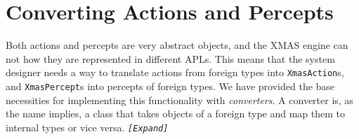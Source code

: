
\section{Converting Actions and Percepts}

Both actions and percepts are very abstract objects, and the XMAS
engine can not how they are represented in different APLs. This means
that the system designer needs a way to translate actions from foreign
types into \texttt{XmasAction}s, and \texttt{XmasPercept}s into percepts
of foreign types. We have provided the base necessities for implementing
this functionality with \emph{converters}. A converter is, as the
name implies, a class that takes objects of a foreign type and map
them to internal types or vice versa. \texttt{\emph{{[}Expand{]}}}

